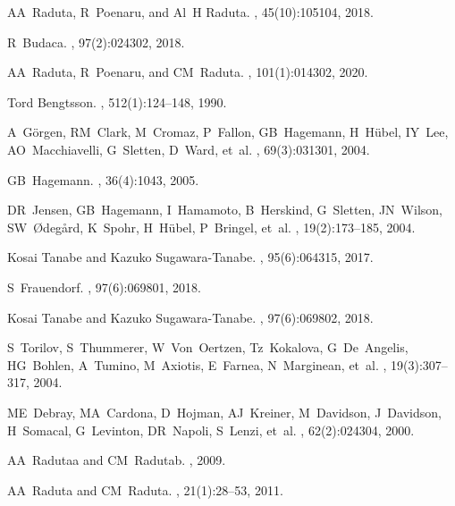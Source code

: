 \documentclass[myclassdoc,debug]{rjparticle}
\begin{document}
\begin{thebibliography}{99}
AA~Raduta, R~Poenaru, and Al~H Raduta.
,
  45(10):105104, 2018.

R~Budaca.
, 97(2):024302, 2018.

AA~Raduta, R~Poenaru, and CM~Raduta.
, 101(1):014302, 2020.

Tord Bengtsson.
, 512(1):124--148, 1990.

A~G{\"o}rgen, RM~Clark, M~Cromaz, P~Fallon, GB~Hagemann, H~H{\"u}bel, IY~Lee,
  AO~Macchiavelli, G~Sletten, D~Ward, et~al.
, 69(3):031301, 2004.

GB~Hagemann.
, 36(4):1043, 2005.

DR~Jensen, GB~Hagemann, I~Hamamoto, B~Herskind, G~Sletten, JN~Wilson,
  SW~{\O}deg{\aa}rd, K~Spohr, H~H{\"u}bel, P~Bringel, et~al.
,
  19(2):173--185, 2004.

Kosai Tanabe and Kazuko Sugawara-Tanabe.
, 95(6):064315, 2017.

S~Frauendorf.
, 97(6):069801, 2018.

Kosai Tanabe and Kazuko Sugawara-Tanabe.
, 97(6):069802, 2018.

S~Torilov, S~Thummerer, W~Von~Oertzen, Tz~Kokalova, G~De~Angelis, HG~Bohlen,
  A~Tumino, M~Axiotis, E~Farnea, N~Marginean, et~al.
,
  19(3):307--317, 2004.

ME~Debray, MA~Cardona, D~Hojman, AJ~Kreiner, M~Davidson, J~Davidson, H~Somacal,
  G~Levinton, DR~Napoli, S~Lenzi, et~al.
, 62(2):024304, 2000.

AA~Radutaa and CM~Radutab.
, 2009.

AA~Raduta and CM~Raduta.
, 21(1):28--53,
  2011.


\end{thebibliography}
\end{document}
